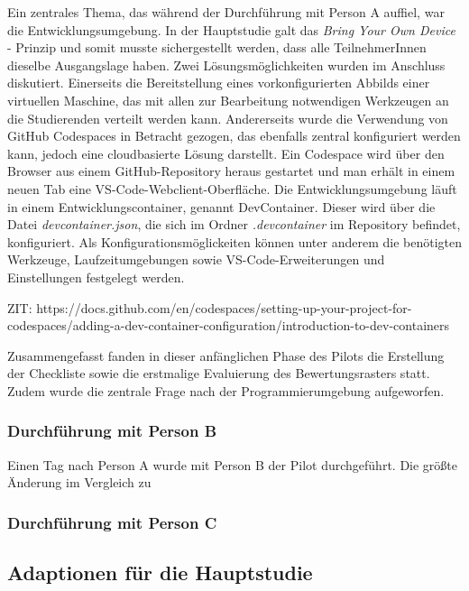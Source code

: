 Ein zentrales Thema, das während der Durchführung mit Person A auffiel, war die Entwicklungsumgebung. In der Hauptstudie galt das \textit{Bring Your Own Device} - Prinzip und somit musste sichergestellt werden, dass alle TeilnehmerInnen dieselbe Ausgangslage haben. Zwei Lösungsmöglichkeiten wurden im Anschluss diskutiert. Einerseits die Bereitstellung eines vorkonfigurierten Abbilds einer virtuellen Maschine, das mit allen zur Bearbeitung notwendigen Werkzeugen an die Studierenden verteilt werden kann. Andererseits wurde die Verwendung von GitHub Codespaces in Betracht gezogen, das ebenfalls zentral konfiguriert werden kann, jedoch eine cloudbasierte Lösung darstellt. Ein Codespace wird über den Browser aus einem GitHub-Repository heraus gestartet und man erhält in einem neuen Tab eine VS-Code-Webclient-Oberfläche. Die Entwicklungsumgebung läuft in einem Entwicklungscontainer, genannt DevContainer. Dieser wird über die Datei \textit{devcontainer.json}, die sich im Ordner \textit{.devcontainer} im Repository befindet, konfiguriert. Als Konfigurationsmöglickeiten können unter anderem die benötigten Werkzeuge, Laufzeitumgebungen sowie VS-Code-Erweiterungen und Einstellungen festgelegt werden.

ZIT: https://docs.github.com/en/codespaces/setting-up-your-project-for-codespaces/adding-a-dev-container-configuration/introduction-to-dev-containers




Zusammengefasst fanden in dieser anfänglichen Phase des Pilots die Erstellung der Checkliste sowie die erstmalige Evaluierung des Bewertungsrasters statt. Zudem wurde die zentrale Frage nach der Programmierumgebung aufgeworfen.

\subsubsection{Durchführung mit Person B}
Einen Tag nach Person A wurde mit Person B der Pilot durchgeführt. Die größte Änderung im Vergleich zu



\subsubsection{Durchführung mit Person C}





\subsection{Adaptionen für die Hauptstudie}

